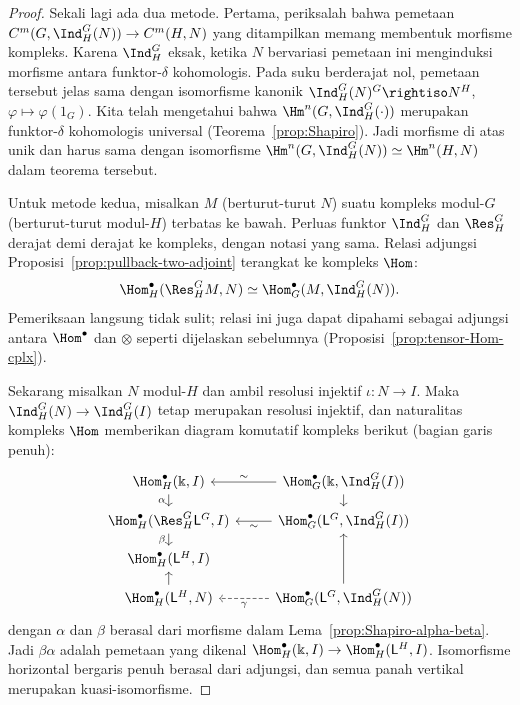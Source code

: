 \begin{proof}
	Sekali lagi ada dua metode. Pertama, periksalah bahwa pemetaan
	$C^m(G,\Ind^G_H(N))\to C^m(H,N)$ yang ditampilkan memang membentuk
	morfisme kompleks. Karena $\Ind^G_H$ eksak, ketika $N$ bervariasi pemetaan
	ini menginduksi morfisme antara funktor-$\delta$ kohomologis. Pada suku
	berderajat nol, pemetaan tersebut jelas sama dengan isomorfisme kanonik
	$\Ind^G_H(N)^G\rightiso N^H$, $\varphi\mapsto\varphi(1_G)$. Kita telah
	mengetahui bahwa $\Hm^n(G,\Ind^G_H(\cdot))$ merupakan funktor-$\delta$
	kohomologis universal (Teorema~\ref{prop:Shapiro}). Jadi morfisme di atas
	unik dan harus sama dengan isomorfisme
	$\Hm^n(G,\Ind^G_H(N))\simeq\Hm^n(H,N)$ dalam teorema tersebut.

	Untuk metode kedua, misalkan $M$ (berturut-turut $N$) suatu kompleks
	modul-$G$ (berturut-turut modul-$H$) terbatas ke bawah. Perluas funktor
	$\Ind^G_H$ dan $\Res^G_H$ derajat demi derajat ke kompleks, dengan notasi
	yang sama. Relasi adjungsi Proposisi~\ref{prop:pullback-two-adjoint} terangkat
	ke kompleks $\Hom$:
	\[ \Hom^\bullet_H(\Res^G_HM,N)
	\simeq\Hom^\bullet_G(M,\Ind^G_H(N)). \]
	Pemeriksaan langsung tidak sulit; relasi ini juga dapat dipahami sebagai
	adjungsi antara $\Hom^\bullet$ dan $\otimes$ seperti dijelaskan sebelumnya
	(Proposisi~\ref{prop:tensor-Hom-cplx}).

	Sekarang misalkan $N$ modul-$H$ dan ambil resolusi injektif
	$\iota:N\to I$. Maka $\Ind^G_H(N)\to\Ind^G_H(I)$ tetap merupakan resolusi
	injektif, dan naturalitas kompleks $\Hom$ memberikan diagram komutatif
	kompleks berikut (bagian garis penuh):
	\begin{equation}\label{eqn:Shapiro-explicit-diagram}
	\begin{tikzcd}[row sep=small]
		\Hom^\bullet_H(\Bbbk,I) \arrow[d,"\alpha"'] &
		\Hom^\bullet_G(\Bbbk,\Ind^G_H(I)) \arrow[l,"\sim"'] \arrow[d] \\
		\Hom^\bullet_H(\Res^G_H\mathsf{L}^G,I) \arrow[d,"\beta"'] &
		\Hom^\bullet_G(\mathsf{L}^G,\Ind^G_H(I)) \arrow[l,"\sim"] \\
		\Hom^\bullet_H(\mathsf{L}^H,I) & \\
		\Hom^\bullet_H(\mathsf{L}^H,N) \arrow[u] &
		\Hom^\bullet_G(\mathsf{L}^G,\Ind^G_H(N))
		\arrow[uu] \arrow[dashed,l,"\gamma"]
	\end{tikzcd}
	\end{equation}
	dengan $\alpha$ dan $\beta$ berasal dari morfisme dalam
	Lema~\ref{prop:Shapiro-alpha-beta}. Jadi $\beta\alpha$ adalah pemetaan yang
	dikenal $\Hom^\bullet_H(\Bbbk,I)\to\Hom^\bullet_H(\mathsf{L}^H,I)$.
	Isomorfisme horizontal bergaris penuh berasal dari adjungsi, dan semua
	panah vertikal merupakan kuasi-isomorfisme.


\end{proof}
